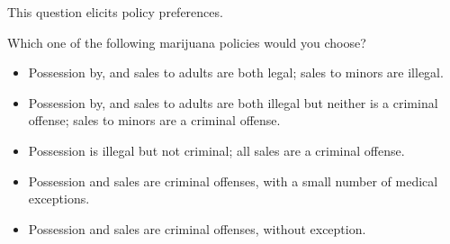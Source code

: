 This question elicits policy preferences.

\begin{tcolorbox}
Which one of the following marijuana policies would you choose?

\begin{itemize}
	\item Possession by, and sales to adults are both legal; sales to minors are illegal.
	\item Possession by, and sales to adults are both illegal but neither is a criminal offense; sales to minors are a criminal offense.
	\item Possession is illegal but not criminal; all sales are a criminal offense.
	\item Possession and sales are criminal offenses, with a small number of medical exceptions.
	\item Possession and sales are criminal offenses, without exception.
\end{itemize}
\end{tcolorbox}
